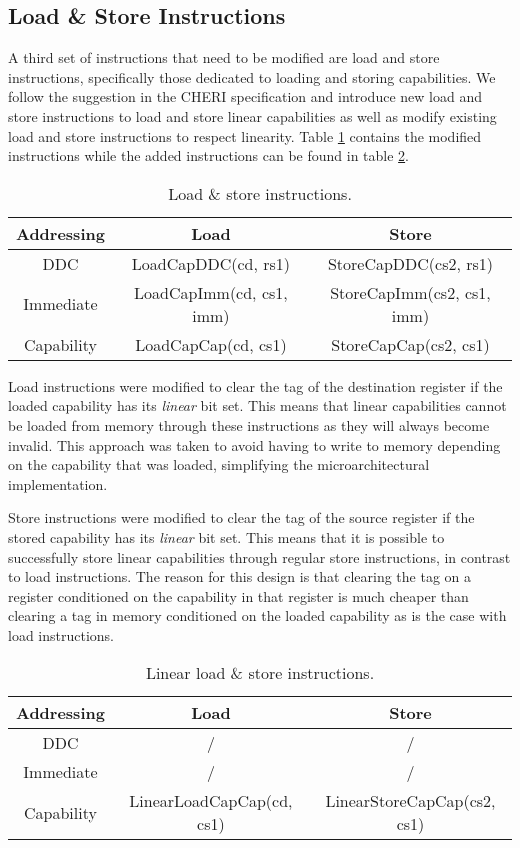 \subsection{Load \& Store Instructions}
A third set of instructions that need to be modified are load and store instructions, specifically those dedicated to loading and storing capabilities. We follow the suggestion in the CHERI specification and introduce new load and store instructions to load and store linear capabilities as well as modify existing load and store instructions to respect linearity. Table \ref{table:loadstoreinst} contains the modified instructions while the added instructions can be found in table \ref{table:linloadstoreinst}.

\begin{table}[h]
\centering
\begin{tabular}{| c | c | c |}
\hline
 Addressing & Load & Store \\
 \hline
 DDC & LoadCapDDC(cd, rs1) & StoreCapDDC(cs2, rs1) \\
 Immediate & LoadCapImm(cd, cs1, imm) & StoreCapImm(cs2, cs1, imm) \\
 Capability & LoadCapCap(cd, cs1) & StoreCapCap(cs2, cs1) \\
\hline
\end{tabular}
\caption{Load \& store instructions.}
\label{table:loadstoreinst}
\end{table}

Load instructions were modified to clear the tag of the destination register if the loaded capability has its \textit{linear} bit set. This means that linear capabilities cannot be loaded from memory through these instructions as they will always become invalid. This approach was taken to avoid having to write to memory depending on the capability that was loaded, simplifying the microarchitectural implementation.

Store instructions were modified to clear the tag of the source register if the stored capability has its \textit{linear} bit set. This means that it is possible to successfully store linear capabilities through regular store instructions, in contrast to load instructions. The reason for this design is that clearing the tag on a register conditioned on the capability in that register is much cheaper than clearing a tag in memory conditioned on the loaded capability as is the case with load instructions.

\begin{table}[h]
\centering
\begin{tabular}{| c | c | c |}
\hline
 Addressing & Load & Store \\
 \hline
 DDC & / & / \\
 Immediate & / & / \\
 Capability & LinearLoadCapCap(cd, cs1) & LinearStoreCapCap(cs2, cs1) \\
\hline
\end{tabular}
\caption{Linear load \& store instructions.}
\label{table:linloadstoreinst}
\end{table}

